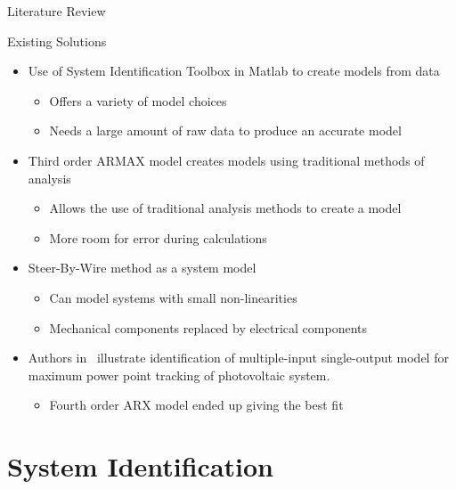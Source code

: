 \documentclass{beamer}
\begin{document}
\begin{frame}{Literature Review}
  \begin{block}{Existing Solutions}
 \begin{itemize}
        \item Use of System Identification Toolbox in Matlab to create models from data~\cite{Adnan2010}
	 \begin{itemize}
		    \tiny
		    		\item Offers a variety of model choices
				\item Needs a large amount of raw data to produce an accurate model
	\end{itemize}
	\item Third order ARMAX model creates models using traditional methods of analysis~\cite{Li1999}
	 \begin{itemize}
		    \tiny
		    		\item Allows the use of traditional analysis methods to create a model 
				\item More room for error during calculations
	\end{itemize}
	\item Steer-By-Wire method as a system model~\cite{Saruchi2015}
	 \begin{itemize}
		    \tiny
		    		\item Can model systems with small non-linearities 
				\item Mechanical components replaced by electrical components 
	\end{itemize}
	\item Authors in~\cite{Hussain2011} illustrate identification of multiple-input single-output model for maximum power point tracking of photovoltaic system.  
	\begin{itemize}
	\tiny
		\item Fourth order ARX model ended up giving the best fit
	\end{itemize}
\end{itemize}
  \end{block}
\end{frame}



\section{System Identification}
\end{document}
